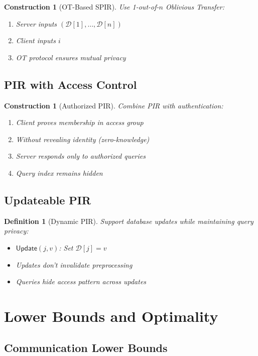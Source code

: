 \documentclass[11pt,final,hidelinks]{article}
\newcommand{\DB}{\mathcal{D}}
\newtheorem{definition}[theorem]{Definition}
\newtheorem{construction}[theorem]{Construction}
\begin{document}
\begin{construction}[OT-Based SPIR]
Use 1-out-of-$n$ Oblivious Transfer:
\begin{enumerate}
    \item Server inputs $(\DB[1], \ldots, \DB[n])$
    \item Client inputs $i$
    \item OT protocol ensures mutual privacy
\end{enumerate}
\end{construction}

\subsection{PIR with Access Control}

\begin{construction}[Authorized PIR]
Combine PIR with authentication:
\begin{enumerate}
    \item Client proves membership in access group
    \item Without revealing identity (zero-knowledge)
    \item Server responds only to authorized queries
    \item Query index remains hidden
\end{enumerate}
\end{construction}

\subsection{Updateable PIR}

\begin{definition}[Dynamic PIR]
Support database updates while maintaining query privacy:
\begin{itemize}
    \item $\mathsf{Update}(j, v)$: Set $\DB[j] = v$
    \item Updates don't invalidate preprocessing
    \item Queries hide access pattern across updates
\end{itemize}
\end{definition}

\section{Lower Bounds and Optimality}

\subsection{Communication Lower Bounds}
\end{document}
